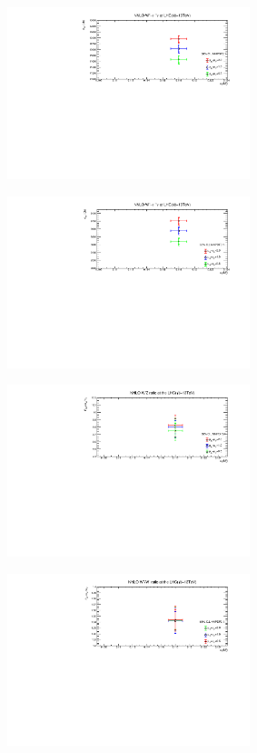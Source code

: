 \begin{figure}[H]
\centering
\begin{subfigure}{0.8\textwidth}
\includegraphics[height=5cm ,width=\textwidth]{chapter4/comp_wp13.pdf}
\vspace*{-8mm}
\caption{}
\label{varwp13}
\end{subfigure}
\begin{subfigure}{0.8\textwidth}
\includegraphics[height=5cm, width=\textwidth]{chapter4/comp_wm13.pdf}
\vspace*{-8mm}
\caption{}
\label{varwm13}
\end{subfigure}
\begin{subfigure}{0.8\textwidth}
\includegraphics[height=5cm, width=\textwidth]{chapter4/RwzRF_68.pdf}
\vspace*{-8mm}
\caption{}
\label{var_rat13}
\end{subfigure}
\begin{subfigure}{0.8\textwidth}
\includegraphics[height=5cm, width=\textwidth]{chapter4/RwwRF_68.pdf}

\end{subfigure}
\end{figure}
